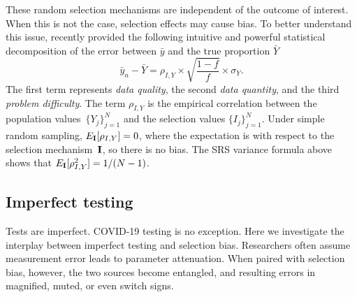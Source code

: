 \documentclass[11pt]{amsart}
\numberwithin{equation}{section}
\theoremstyle{plain}
\def\I{\bf I}
\begin{document}
 These random selection mechanisms are independent of the outcome of interest. When this is not the case, selection effects may cause bias. To better understand this issue, \cite{Meng2018} recently provided the following intuitive and powerful statistical decomposition of the error between $\bar y$ and the true proportion $\bar Y$
 $$
 \bar y_n - \bar Y =  \rho_{I, Y} \times \sqrt{\frac{1-f}{f}} \times \sigma_Y.
 $$
 The first term represents \emph{data quality}, the second \emph{data quantity}, and the third \emph{problem difficulty}. The term $\rho_{I,Y}$ is the empirical correlation between the population values~$\{ Y_j \}_{j=1}^N$ and the selection values $\{ I_j \}_{j=1}^N$.  Under simple random sampling, $E_{\I} [ \rho_{I,Y} ] = 0$, where the expectation is with respect to the selection mechanism~$\I$, so there is no bias.  The SRS variance formula above shows that $E_{\I} [ \rho_{I,Y}^2 ]  = 1/(N-1)$.


 \subsection{Imperfect testing}
 \label{section:imperfecttesting}

 Tests are imperfect.  COVID-19 testing is no exception. Here we investigate the interplay between imperfect testing and selection bias.  Researchers often assume measurement error leads to parameter attenuation.  When paired with selection bias, however, the two sources become entangled, and resulting errors in magnified, muted, or even switch signs.
\end{document}
